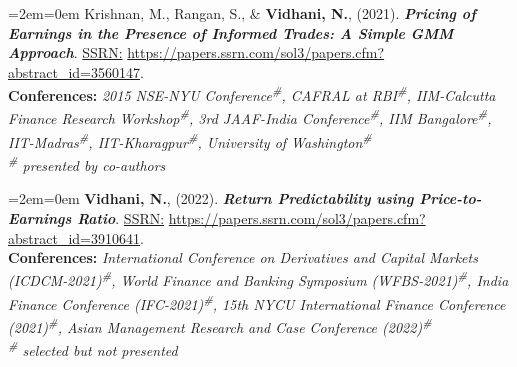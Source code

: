 \documentclass[11pt,a4paper,]{moderncv}
\begin{document}
\bgroup %
  \par%
  \medskip
  \leftskip=2em\rightskip=0em%
  \noindent\ignorespaces
Krishnan, M., Rangan, S., \& \textbf{Vidhani, N.}, (2021). \textbf{\textit{Pricing of Earnings in the Presence of Informed Trades: A Simple GMM Approach}}. \underline{SSRN:} \url{https://papers.ssrn.com/sol3/papers.cfm?abstract_id=3560147}.\\
\textbf{Conferences:} \textit{2015 NSE-NYU Conference\textsuperscript{\#}, CAFRAL at RBI\textsuperscript{\#}, IIM-Calcutta Finance Research Workshop\textsuperscript{\#}, 3rd JAAF-India Conference\textsuperscript{\#}, IIM Bangalore\textsuperscript{\#}, IIT-Madras\textsuperscript{\#}, IIT-Kharagpur\textsuperscript{\#}, University of Washington\textsuperscript{\#}}\\
\textit{\textsuperscript{\#} presented by co-authors}\\
%
  \par\medskip\egroup

\bgroup %
  \par%
  \medskip
  \leftskip=2em\rightskip=0em%
  \noindent\ignorespaces
\textbf{Vidhani, N.}, (2022). \textbf{\textit{Return Predictability using
Price-to-Earnings Ratio}}. \underline{SSRN:} \url{https://papers.ssrn.com/sol3/papers.cfm?abstract_id=3910641}.\\
\textbf{Conferences:} \textit{International Conference on Derivatives and Capital Markets (ICDCM-2021)\textsuperscript{\#}, World Finance and Banking Symposium (WFBS-2021)\textsuperscript{\#}, India Finance Conference (IFC-2021)\textsuperscript{\#}, 15th NYCU International Finance Conference (2021)\textsuperscript{\#}, Asian Management Research and Case Conference (2022)\textsuperscript{\#}}\\
\textit{\textsuperscript{\#} selected but not presented}\\
%
  \par\medskip\egroup

\endgroup
\end{document}
